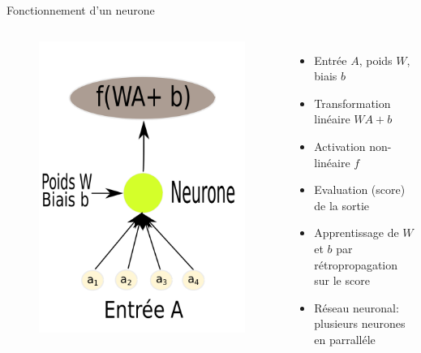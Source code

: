 \documentclass{beamer}
\begin{document}
\begin{frame}{Fonctionnement d'un neurone}

  \begin{columns}
    \begin{figure}
      \centering
      \includegraphics[scale=0.17]{../Figures/Neuron}
    \end{figure}

    \begin{itemize}
    \item Entrée $A$, poids $W$, biais $b$
    \item Transformation linéaire $WA + b$\pause
    \item Activation non-linéaire $f$\pause
    \item Evaluation (score) de la sortie \pause
    \item Apprentissage de $W$ et $b$ par rétropropagation sur le score
    \item Réseau neuronal: plusieurs neurones en parralléle
    \end{itemize}
  \end{columns}

\end{frame}
\end{document}
